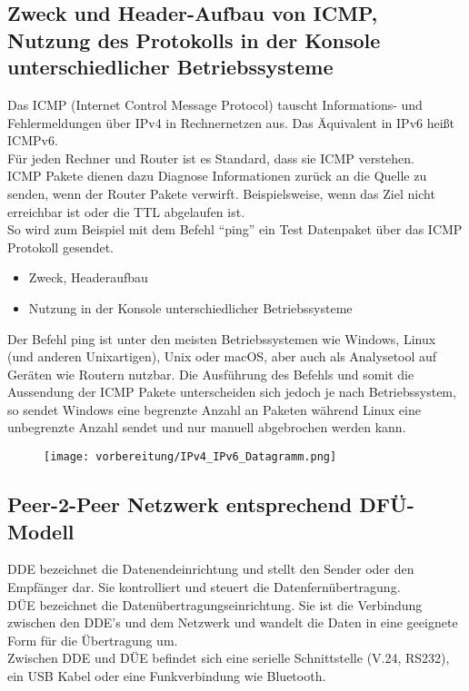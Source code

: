 \subsection{Zweck und Header-Aufbau von ICMP, Nutzung des Protokolls in der Konsole unterschiedlicher Betriebssysteme}
    Das ICMP (Internet Control Message Protocol) tauscht Informations- und Fehlermeldungen über IPv4 in Rechnernetzen aus. Das Äquivalent in IPv6 heißt ICMPv6.\\
    Für jeden Rechner und Router ist es Standard, dass sie ICMP verstehen.\\
    ICMP Pakete dienen dazu Diagnose Informationen zurück an die Quelle zu senden, wenn der Router Pakete verwirft. Beispielsweise, wenn das Ziel nicht erreichbar ist oder die TTL abgelaufen ist.\\
    So wird zum Beispiel mit dem Befehl “ping” ein Test Datenpaket über das ICMP Protokoll gesendet.\\
    \begin{itemize}
        \item Zweck, Headeraufbau
        \item Nutzung in der Konsole unterschiedlicher Betriebssysteme
    \end{itemize}

    Der Befehl ping ist unter den meisten Betriebssystemen wie Windows, Linux (und anderen Unixartigen), Unix oder macOS, aber auch als Analysetool auf Geräten wie Routern nutzbar. Die Ausführung des Befehls und somit die Aussendung der ICMP Pakete unterscheiden sich jedoch je nach Betriebssystem, so sendet Windows eine begrenzte Anzahl an Paketen während Linux eine unbegrenzte Anzahl sendet und nur manuell abgebrochen werden kann.\\

    \begin{figure}[ht]
        \centering
        \texttt{[image: vorbereitung/IPv4\_IPv6\_Datagramm.png]}
    \end{figure}




\subsection{Peer-2-Peer Netzwerk entsprechend DFÜ-Modell}

    DDE bezeichnet die Datenendeinrichtung und stellt den Sender oder den Empfänger dar. Sie kontrolliert und steuert die Datenfernübertragung.\\
    DÜE bezeichnet die Datenübertragungseinrichtung. Sie ist die Verbindung zwischen den DDE’s und dem Netzwerk und wandelt die Daten in eine geeignete Form für die Übertragung um.\\
    Zwischen DDE und DÜE befindet sich eine serielle Schnittstelle (V.24, RS232), ein USB Kabel oder eine Funkverbindung wie Bluetooth.\\

